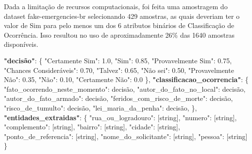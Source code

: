 \documentclass{IEEEphot}
\begin{document}
Dada a limitação de recursos computacionais, foi feita uma amostragem do dataset fake-emergencies-br selecionando 429 amostras, as quais deveriam ter o valor de Sim para pelo menos um dos 6 atributos binários de Classificação de Ocorrência. Isso resultou no uso de aproximadamente 26\% das 1640 amostras disponíveis.

\begin{algorithm}[H]
\caption{\textit{Template} de classificação e extração.}\label{alg:template_info}
\begin{algorithmic}
\STATE \textbf{"decisão"}: \{
\STATE \hspace{0.25cm} "Certamente Sim": 1.0,
\STATE \hspace{0.25cm} "Sim": 0.85,
\STATE \hspace{0.25cm} "Provavelmente Sim": 0.75,
\STATE \hspace{0.25cm} "Chances Consideráveis": 0.70,
\STATE \hspace{0.25cm} "Talvez": 0.65,
\STATE \hspace{0.25cm} "Não sei": 0.50,
\STATE \hspace{0.25cm} "Provavelmente Não": 0.35,
\STATE \hspace{0.25cm} "Não": 0.10,
\STATE \hspace{0.25cm} "Certamente Não": 0.0
\STATE \},
\STATE \textbf{"classificacao\_ocorrencia"}: \{
\STATE \hspace{0.25cm} "fato\_ocorrendo\_neste\_momento": decisão,
\STATE \hspace{0.25cm} "autor\_do\_fato\_no\_local": decisão,
\STATE \hspace{0.25cm} "autor\_do\_fato\_armado": decisão,
\STATE \hspace{0.25cm} "feridos\_com\_risco\_de\_morte": decisão,
\STATE \hspace{0.25cm} "risco\_de\_tumulto": decisão,
\STATE \hspace{0.25cm} "lei\_maria\_da\_penha": decisão,
\STATE \},
\STATE \textbf{"entidades\_extraidas"}: \{
\STATE \hspace{0.25cm} "rua\_ou\_logradouro": [string],
\STATE \hspace{0.25cm} "numero": [string],
\STATE \hspace{0.25cm} "complemento": [string],
\STATE \hspace{0.25cm} "bairro": [string],
\STATE \hspace{0.25cm} "cidade": [string],
\STATE \hspace{0.25cm} "ponto\_de\_referencia": [string],
\STATE \hspace{0.25cm} "nome\_do\_solicitante": [string],
\STATE \hspace{0.25cm} "pessoa": [string]
\STATE \}
\end{algorithmic}
\end{algorithm}
\end{document}
